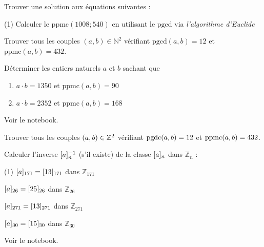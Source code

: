 \begin{exstheorie}
\eexo

\exo
Trouver une solution aux équations suivantes : 
\begin{tasks}[after-item-skip=2mm,item-indent=5mm,column-sep=1mm,label-offset=1mm](1)
\task Calculer le $\text{ppmc}(1008; 540)$ en utilisant le $\text{pgcd}$ via \textit{l'algorithme d'Euclide}

\task Trouver tous les couples $(a,b) \in \mathbb{N}^2$ vérifiant $\text{pgcd}(a,b) = 12$ et $\text{ppmc}(a,b) = 432$.

\task Déterminer les entiers naturels $a$ et $b$ sachant que
\begin{enumerate}[label=\textbf{\arabic*)}, leftmargin=*]
	\item $a \cdot b = 1350$ et $\text{ppmc}(a,b) = 90$
	\item $a \cdot b = 2352$ et $\text{ppmc}(a,b) = 168$
\end{enumerate}
\end{tasks}

\eexo


\exordi Voir le notebook.


\eexo

\exo
Trouver tous les couples $(a,b)\in\Z^2$ vérifiant $\pgdc(a,b)=12$ et $\ppmc(a,b)=432$.



\eexo

\exo
Calculer l'inverse $\cl{a}^{-1}$ (s'il existe) de la classe $\cl{a}$ dans  $\mathbb{Z}_n$ :
\begin{tasks}[after-item-skip=2mm,item-indent=5mm,column-sep=1mm,label-offset=1mm](1)
	\task $\cl[171]{a} = \cl[171]{13}$ dans $\mathbb{Z}_{171}$
	
	\task $\cl[26]{a} = \cl[26]{25}$ dans $\mathbb{Z}_{26}$

	\task $\cl[271]{a} = \cl[271]{13}$ dans $\mathbb{Z}_{271}$
	
	\task $\cl[30]{a} = \cl[30]{15}$ dans $\mathbb{Z}_{30}$
\end{tasks}

\eexo

\exordi Voir le notebook.



\end{exstheorie}



\pagebreak

